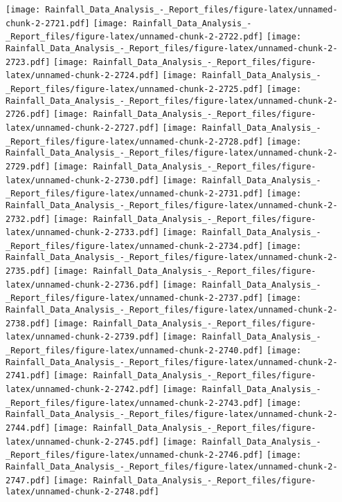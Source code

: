 \documentclass[
]{article}
\begin{document}
\texttt{[image: Rainfall\_Data\_Analysis\_-\_Report\_files/figure-latex/unnamed-chunk-2-2721.pdf]}
\texttt{[image: Rainfall\_Data\_Analysis\_-\_Report\_files/figure-latex/unnamed-chunk-2-2722.pdf]}
\texttt{[image: Rainfall\_Data\_Analysis\_-\_Report\_files/figure-latex/unnamed-chunk-2-2723.pdf]}
\texttt{[image: Rainfall\_Data\_Analysis\_-\_Report\_files/figure-latex/unnamed-chunk-2-2724.pdf]}
\texttt{[image: Rainfall\_Data\_Analysis\_-\_Report\_files/figure-latex/unnamed-chunk-2-2725.pdf]}
\texttt{[image: Rainfall\_Data\_Analysis\_-\_Report\_files/figure-latex/unnamed-chunk-2-2726.pdf]}
\texttt{[image: Rainfall\_Data\_Analysis\_-\_Report\_files/figure-latex/unnamed-chunk-2-2727.pdf]}
\texttt{[image: Rainfall\_Data\_Analysis\_-\_Report\_files/figure-latex/unnamed-chunk-2-2728.pdf]}
\texttt{[image: Rainfall\_Data\_Analysis\_-\_Report\_files/figure-latex/unnamed-chunk-2-2729.pdf]}
\texttt{[image: Rainfall\_Data\_Analysis\_-\_Report\_files/figure-latex/unnamed-chunk-2-2730.pdf]}
\texttt{[image: Rainfall\_Data\_Analysis\_-\_Report\_files/figure-latex/unnamed-chunk-2-2731.pdf]}
\texttt{[image: Rainfall\_Data\_Analysis\_-\_Report\_files/figure-latex/unnamed-chunk-2-2732.pdf]}
\texttt{[image: Rainfall\_Data\_Analysis\_-\_Report\_files/figure-latex/unnamed-chunk-2-2733.pdf]}
\texttt{[image: Rainfall\_Data\_Analysis\_-\_Report\_files/figure-latex/unnamed-chunk-2-2734.pdf]}
\texttt{[image: Rainfall\_Data\_Analysis\_-\_Report\_files/figure-latex/unnamed-chunk-2-2735.pdf]}
\texttt{[image: Rainfall\_Data\_Analysis\_-\_Report\_files/figure-latex/unnamed-chunk-2-2736.pdf]}
\texttt{[image: Rainfall\_Data\_Analysis\_-\_Report\_files/figure-latex/unnamed-chunk-2-2737.pdf]}
\texttt{[image: Rainfall\_Data\_Analysis\_-\_Report\_files/figure-latex/unnamed-chunk-2-2738.pdf]}
\texttt{[image: Rainfall\_Data\_Analysis\_-\_Report\_files/figure-latex/unnamed-chunk-2-2739.pdf]}
\texttt{[image: Rainfall\_Data\_Analysis\_-\_Report\_files/figure-latex/unnamed-chunk-2-2740.pdf]}
\texttt{[image: Rainfall\_Data\_Analysis\_-\_Report\_files/figure-latex/unnamed-chunk-2-2741.pdf]}
\texttt{[image: Rainfall\_Data\_Analysis\_-\_Report\_files/figure-latex/unnamed-chunk-2-2742.pdf]}
\texttt{[image: Rainfall\_Data\_Analysis\_-\_Report\_files/figure-latex/unnamed-chunk-2-2743.pdf]}
\texttt{[image: Rainfall\_Data\_Analysis\_-\_Report\_files/figure-latex/unnamed-chunk-2-2744.pdf]}
\texttt{[image: Rainfall\_Data\_Analysis\_-\_Report\_files/figure-latex/unnamed-chunk-2-2745.pdf]}
\texttt{[image: Rainfall\_Data\_Analysis\_-\_Report\_files/figure-latex/unnamed-chunk-2-2746.pdf]}
\texttt{[image: Rainfall\_Data\_Analysis\_-\_Report\_files/figure-latex/unnamed-chunk-2-2747.pdf]}
\texttt{[image: Rainfall\_Data\_Analysis\_-\_Report\_files/figure-latex/unnamed-chunk-2-2748.pdf]}
\end{document}
